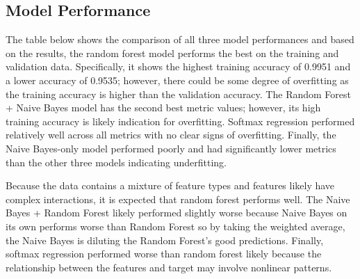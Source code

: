 \documentclass[12pt]{article}
\begin{document}

\subsection*{Model Performance}

The table below shows the comparison of all three model performances and based on the results, the random forest model performs the best on the training and validation data. Specifically, it shows the highest training accuracy of 0.9951 and a lower accuracy of 0.9535; however, there could be some degree of overfitting as the training accuracy is higher than the validation accuracy. The Random Forest + Naive Bayes model has the second best metric values; however, its high training accuracy is likely indication for overfitting. Softmax regression performed relatively well across all metrics with no clear signs of overfitting. Finally, the Naive Bayes-only model performed poorly and had significantly lower metrics than the other three models indicating underfitting. 

Because the data contains a mixture of feature types and features likely have complex interactions, it is expected that random forest performs well. The Naive Bayes + Random Forest likely performed slightly worse because Naive Bayes on its own performs worse than Random Forest so by taking the weighted average, the Naive Bayes is diluting the Random Forest's good predictions. Finally, softmax regression performed worse than random forest likely because the relationship between the features and target may involve nonlinear patterns.
\end{document}
